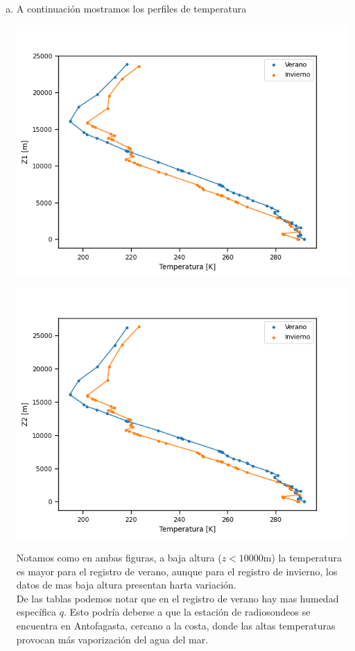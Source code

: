\documentclass[class=article,crop=false]{standalone}
\begin{document}
\begin{enumerate}[a)]
\item A continuación mostramos los perfiles de temperatura\\
    \begin{minipage}{0.49\linewidth}
        \includegraphics[width=1.1\linewidth]{Z1.png}
    \end{minipage}
        \hfill
    \begin{minipage}{0.49\linewidth}
        \includegraphics[width=1.1\linewidth]{Z2.png}
    \end{minipage}

    Notamos como en ambas figuras, a baja altura ($z<10000$m) la temperatura es mayor para el registro de verano, aunque para el registro de invierno, los datos de mas baja altura presentan harta variación. \\
    De las tablas podemos notar que en el registro de verano hay mas humedad específica $q$. Esto podría deberse a que la estación de radiosondeos se encuentra en Antofagasta, cercano a la costa, donde las altas temperaturas provocan más vaporización del agua del mar. 


\end{enumerate}
\end{document}
